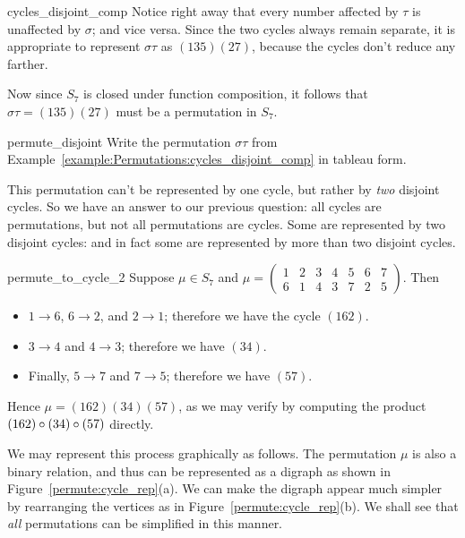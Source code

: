 \begin{example}{cycles_disjoint_comp}
Notice right away that every number affected by $\tau$ is unaffected by $\sigma$; and vice versa. Since the two cycles always  remain separate, it is appropriate to represent $\sigma \tau$ as $(135)(27)$, because the cycles don't reduce any farther.
\end{example}

Now since $S_7$ is closed under function composition, it follows that $\sigma \tau = (135)(27)$ must be a permutation in $S_7$.

\begin{exercise}{permute_disjoint}
Write the permutation $\sigma \tau$ from Example~\ref{example:Permutations:cycles_disjoint_comp} in tableau form.
\end{exercise}

This permutation can't be represented by one cycle, but rather by \emph{two} disjoint cycles.  So we have an answer to our previous question: all cycles are permutations, but not all permutations are cycles.  Some are represented by two disjoint cycles: and in fact some are represented by more than two disjoint cycles.

\begin{example}{permute_to_cycle_2}
Suppose $\mu \in S_7$ and $\mu = \begin{pmatrix} 1 & 2 & 3 & 4 & 5 & 6 & 7 \\ 6 & 1 & 4 & 3 & 7 & 2 & 5 \end{pmatrix}$.  Then
\begin{itemize}
\item
$1 \to 6$, $6 \to 2$, and $2 \to 1$;  therefore we have the cycle $(162)$.
\item
$3 \to 4$ and $4 \to 3$; therefore we have $(34)$. 
\item
Finally, $5 \to 7$ and $7 \to 5$; therefore we have $(57)$. 
\end{itemize}

\noindent
Hence $\mu = (162)(34)(57)$, as we may verify by computing the product $(162)\circ (34)\circ (57)$ directly.

We may represent this process graphically as follows. The permutation $\mu$ is also a binary relation, and thus can be represented as a digraph as shown in Figure~\ref{permute:cycle_rep}(a). We can make the digraph appear much simpler by rearranging the vertices as in Figure~\ref{permute:cycle_rep}(b). We shall see that \emph{all} permutations can be simplified in this manner.
\end{example}

